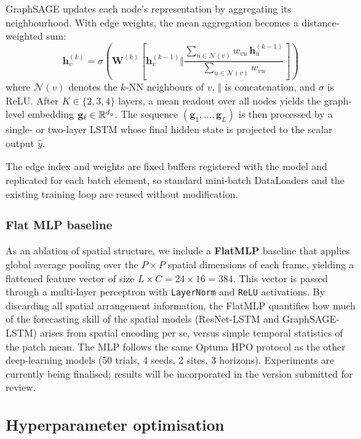 GraphSAGE \cite{hamilton2017} updates each node's representation by aggregating
its neighbourhood. With edge weights, the mean aggregation becomes a
distance-weighted sum:
\begin{equation}
  \mathbf{h}_v^{(k)} = \sigma\!\left(
    \mathbf{W}^{(k)} \left[ \mathbf{h}_v^{(k-1)} \Vert
    \frac{\sum_{u \in \mathcal{N}(v)} w_{vu}\,\mathbf{h}_u^{(k-1)}}
         {\sum_{u \in \mathcal{N}(v)} w_{vu}} \right]
  \right)
  \label{eq:sage}
\end{equation}
where $\mathcal{N}(v)$ denotes the $k$-NN neighbours of $v$, $\Vert$ is
concatenation, and $\sigma$ is ReLU. After $K \in \{2,3,4\}$ layers, a mean
readout over all nodes yields the graph-level embedding
$\mathbf{g}_\ell \in \mathbb{R}^{d_g}$. The sequence
$(\mathbf{g}_1, \ldots, \mathbf{g}_L)$ is then processed by a single- or
two-layer LSTM whose final hidden state is projected to the scalar output $\hat{y}$.

The edge index and weights are fixed buffers registered with the model and
replicated for each batch element, so standard mini-batch DataLoaders and the
existing training loop are reused without modification.

\subsubsection{Flat MLP baseline}
\label{ssec:mlp}

As an ablation of spatial structure, we include a \textbf{FlatMLP} baseline that
applies global average pooling over the $P \times P$ spatial dimensions of each
frame, yielding a flattened feature vector of size $L \times C = 24 \times 16 = 384$.
This vector is passed through a multi-layer perceptron with \texttt{LayerNorm} and
\texttt{ReLU} activations. By discarding all spatial arrangement information,
the FlatMLP quantifies how much of the forecasting skill of the spatial models
(ResNet-LSTM and GraphSAGE-LSTM) arises from spatial encoding per se, versus
simple temporal statistics of the patch mean. The MLP follows the same Optuna
HPO protocol as the other deep-learning models (50 trials, 4 seeds, 2 sites,
3 horizons). Experiments are currently being finalised; results will be
incorporated in the version submitted for review.

\subsection{Hyperparameter optimisation}
\label{ssec:optuna}

